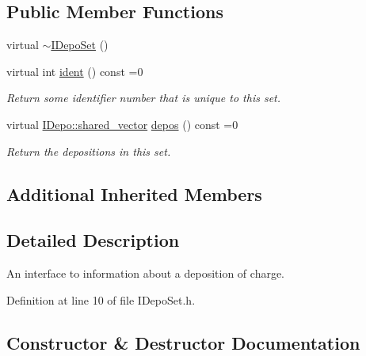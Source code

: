 \subsection*{Public Member Functions}
\begin{DoxyCompactItemize}
\item 
virtual \hyperlink{class_wire_cell_1_1_i_depo_set_a3d1b08f30d79d871079f4cfbe7b77ad8}{$\sim$\+I\+Depo\+Set} ()
\item 
virtual int \hyperlink{class_wire_cell_1_1_i_depo_set_a569837954a71574c7f8675da720d280a}{ident} () const =0
\begin{DoxyCompactList}\small\item\em Return some identifier number that is unique to this set. \end{DoxyCompactList}\item 
virtual \hyperlink{class_wire_cell_1_1_i_data_a6edac35e7dd886018740993b28c7ca1e}{I\+Depo\+::shared\+\_\+vector} \hyperlink{class_wire_cell_1_1_i_depo_set_abbaa8ccebefb3034e8c725d8fe069508}{depos} () const =0
\begin{DoxyCompactList}\small\item\em Return the depositions in this set. \end{DoxyCompactList}\end{DoxyCompactItemize}
\subsection*{Additional Inherited Members}


\subsection{Detailed Description}
An interface to information about a deposition of charge. 

Definition at line 10 of file I\+Depo\+Set.\+h.



\subsection{Constructor \& Destructor Documentation}
\mbox{\label{class_wire_cell_1_1_i_depo_set_a3d1b08f30d79d871079f4cfbe7b77ad8}} 
